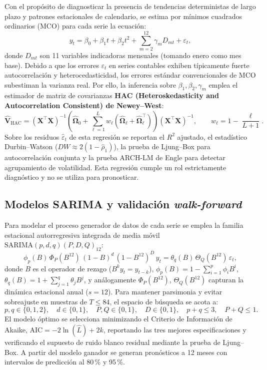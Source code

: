 \documentclass[11pt,letterpaper]{article}
\begin{document}
Con el propósito de diagnosticar la presencia de tendencias deterministas de largo plazo y patrones estacionales de calendario, se estima por mínimos cuadrados ordinarios (MCO) para cada serie la ecuación:
\[
y_t = \beta_0 + \beta_1 t + \beta_2 t^2 + \sum_{m=2}^{12} \gamma_m D_{mt} + \varepsilon_t,
\]
donde \(D_{mt}\) son 11 variables indicadoras mensuales (tomando enero como mes base). Debido a que los errores \(\varepsilon_t\) en series contables exhiben típicamente fuerte autocorrelación y heterocedasticidad, los errores estándar convencionales de MCO subestiman la varianza real. Por ello, la inferencia sobre \(\beta_1, \beta_2, \gamma_m\) emplea el estimador de matriz de covarianzas \textbf{HAC (Heteroskedasticity and Autocorrelation Consistent) de Newey--West}:
\[
\widehat{\mathbf{V}}_{\text{HAC}} = (\mathbf{X}^\top \mathbf{X})^{-1} \left( \widehat{\boldsymbol{\Omega}}_0 + \sum_{\ell=1}^{L} w_\ell \left(\widehat{\boldsymbol{\Omega}}_\ell + \widehat{\boldsymbol{\Omega}}_\ell^\top\right) \right) (\mathbf{X}^\top \mathbf{X})^{-1}, \qquad w_\ell = 1 - \frac{\ell}{L+1}.
\]
Sobre los residuos \(\hat{\varepsilon}_t\) de esta regresión se reportan el \(R^2\) ajustado, el estadístico Durbin--Watson (\(DW \approx 2(1-\hat{\rho}_1)\)), la prueba de Ljung--Box para autocorrelación conjunta y la prueba ARCH-LM de Engle para detectar agrupamiento de volatilidad. Esta regresión cumple un rol estrictamente diagnóstico y no se utiliza para pronosticar.

\subsection{Modelos SARIMA y validación \emph{walk-forward}}

Para modelar el proceso generador de datos de cada serie se emplea la familia estacional autorregresiva integrada de media móvil \(\text{SARIMA}(p,d,q)(P,D,Q)_{12}\):
\[
\phi_p(B)\,\Phi_P(B^{12})\,(1 - B)^d\,(1 - B^{12})^D\,y_t = \theta_q(B)\,\Theta_Q(B^{12})\,\varepsilon_t,
\]
donde \(B\) es el operador de rezago (\(B^k y_t = y_{t-k}\)), \(\phi_p(B) = 1 - \sum_{i=1}^p \phi_i B^i\), \(\theta_q(B) = 1 + \sum_{j=1}^q \theta_j B^j\), y análogamente \(\Phi_P(B^{12})\), \(\Theta_Q(B^{12})\) capturan la dinámica estacional anual (\(s = 12\)). Para mantener parsimonia y evitar sobreajuste en muestras de \(T \le 84\), el espacio de búsqueda se acota a:
\[
p,q \in \{0,1,2\}, \quad d \in \{0,1\}, \quad P,Q \in \{0,1\}, \quad D \in \{0,1\}, \quad p+q \le 3, \quad P+Q \le 1.
\]
El modelo óptimo se selecciona minimizando el Criterio de Información de Akaike, \(\text{AIC} = -2\ln(\hat{L}) + 2k\), reportando las tres mejores especificaciones y verificando el supuesto de ruido blanco residual mediante la prueba de Ljung--Box. A partir del modelo ganador se generan pronósticos a 12 meses con intervalos de predicción al 80\,\% y 95\,\%.
\end{document}
